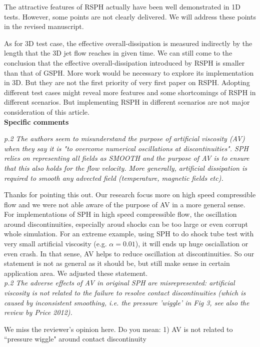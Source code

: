 \documentclass[10pt,a4paper]{article}
\begin{document}
The attractive features of RSPH actually have been well demonstrated in 1D tests. However, some points are not clearly delivered. We will address these points in the revised manuscript.

As for 3D test case, the effective overall-dissipation is measured indirectly by the length that the 3D jet flow reaches in given time. We can still come to the conclusion that the effective overall-dissipation introduced by RSPH is smaller than that of GSPH. More work would be necessary to explore its implementation in 3D. But they are not the first priority of very first paper on RSPH. Adopting different test cases might reveal more features and some shortcomings of RSPH in different scenarios. But implementing RSPH in different scenarios are not major consideration of this article.
\\[12pt]

\textbf{\large Specific comments}

\textit{p.2 The authors seem to misunderstand the purpose of artificial viscosity (AV) when they say it is "to overcome numerical oscillations at
discontinuities". SPH relies on representing all fields as SMOOTH and the purpose of AV is to ensure that this also holds for the flow velocity.
More generally, artificial dissipation is required to smooth any advected field (temperature, magnetic fields etc).}

Thanks for pointing this out. Our research focus more on high speed compressible flow and we were not able aware of the purpose of AV in a more general sense. For implementations of SPH in high speed compressible flow, the oscillation around discontinuities, especially aroud shocks can be too large or even corrupt whole simulation. For an extreme example, using SPH to do shock tube test with very small artificial viscosity (e.g. $\alpha = 0.01$), it will ends up huge osciallation or even crash. In that sense, AV helps to reduce oscillation at discontinuities. So our statement is not as general as it should be, but still make sense in certain application area. We adjusted these statement.
\\[3pt]

\textit{p.2 The adverse effects of AV in original SPH are misrepresented: artificial viscosity is not related to the failure to resolve contact discontinuities (which is caused by inconsistent smoothing, i.e. the pressure 'wiggle' in Fig 3, see also the review by Price 2012).}

We miss the reviewer's opinion here.
Do you mean: 
1) AV is not related to ``pressure wiggle" around contact discontinuity
\end{document}
